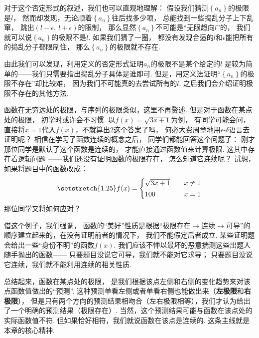 \vspace{0.5em}

对于这个否定形式的叙述，我们也可以直观地理解：
假设我们猜测$\left \{ a_{n} \right \}$的极限是$l$，
然而却发现，无论顺着$\left \{ a_{n} \right \}$往后找多少项，
总能找到一些捣乱分子上下乱窜，
跳出$(l-\epsilon,~l+\epsilon)$的限制，
那么显然$\left \{ a_{n} \right \}$不可能是“无限趋向$l$”的，
我们就可以说$\left \{ a_{n} \right \}$的极限不是$l$.
如果我们猜了一圈，
都没有发现合适的$l$和$\epsilon$能把所有的捣乱分子都限制住，
那么$\left \{ a_{n} \right \}$的极限就不存在.

由此我们可以发现，利用定义的否定形式证明$a_{n}$的极限不是某个给定的$l$
是较为简单的——我们只需要指出捣乱分子具体是谁即可.
但是，用定义法证明“$\left \{ a_{n} \right \}$的极限不存在”却比较难，
因为我们不可能真的去尝试所有的$l$.
之后我们会介绍证明极限不存在的其他方法.\vspace{0.5em}

函数在无穷远处的极限，与序列的极限类似，这里不再赘述.
但是对于函数在某点处的极限，
初学时或许会不习惯.
以$f(x) = \sqrt{3x+1}$为例，
有同学可能会问，直接将$x=1$代入$f(x)$，不就算出$2$这个答案了吗，
何必大费周章地用$\epsilon\text{-}\delta$语言去证明呢？
相信在学习了函数连续的概念之后，
同学们都能回答这个问题了：
刚才那位同学是默认了这个函数是连续的，
才能直接通过函数值来计算极限.
这其中存在着逻辑问题
——我们还没有证明函数的极限存在，
怎么知道它连续呢？
试想，如果将题目中的函数改成：
\[
\setstretch{1.25}
f(x)=
\begin{cases}
\sqrt{3x+1} &\quad x \ne 1
\\[2pt]
100 &\quad x = 1
\end{cases}
\] 
那位同学又将如何应对？

借这个例子，我们强调，
函数的“美好”性质是根据“极限存在$\to$连续$\to$可导”的顺序建立起来的，在没有证明前者的情况下，
我们不能假定后者成立.
某些证明题会给出一些“身份不明”的函数$f(x)$.
我们应该不惮以最坏的恶意揣测这些出题人随手抛出的函数——
只要题目没说它可导，我们就不能对它求导；
只要题目没说它连续，我们就不能利用连续的相关性质.\vspace{0.5em}

总结起来，函数在某点处的极限，
是我们根据该点左侧和右侧的变化趋势来对该点函数值做出的“预测”.
这种预测单看左侧或者单看右侧也能做出来（\textbf{左极限}和\textbf{右极限}），
但是只有两个方向的预测结果相吻合（左右极限相等），我们才认为给出了一个明确的预测结果（极限存在）. 当然，这个预测结果可能与函数在该点处的实际函数值不符.
但如果恰好相符，我们就说函数在该点是连续的.
这条主线就是本章的核心精神.

